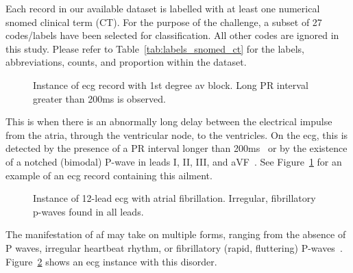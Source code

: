 \documentclass[\main/thesis.tex]{subfiles}
\begin{document}
Each record in our available dataset is labelled with at least one numerical \gls{snomed} clinical term (CT).
For the purpose of the challenge, a subset of 27 codes/labels have been selected for classification.
All other codes are ignored in this study.
Please refer to Table~\ref{tab:labels_snomed_ct} for the labels, abbreviations, counts, and proportion within the dataset.



\begin{description}
    \begin{figure}[H]
        \centering
        \caption{Instance of \gls{ecg} record with 1st degree av block. Long PR interval greater than 200ms is observed.}
        \label{fig:full_IAVB}
    \end{figure}
    \item[\gls{iavb}] This is when there is an abnormally long delay between the electrical impulse from the atria, through the ventricular node, to the ventricles. On the \gls{ecg}, this is detected by the presence of a PR interval longer than 200ms~\cite{carroz_pseudo-pacemaker_2010} or by the existence of a notched (bimodal) P-wave in leads I, II, III, and aVF~\cite{bayes_de_luna_diagnosis_2017}. See Figure~\ref{fig:full_IAVB} for an example of an \gls{ecg} record containing this ailment.
    
    \begin{figure}[H]
        \centering
        \caption{Instance of 12-lead \gls{ecg} with atrial fibrillation. Irregular, fibrillatory p-waves found in all leads.}
        \label{fig:full_AF}
    \end{figure}
    \item[\gls{af}] The manifestation of \gls{af} may take on multiple forms, ranging from the absence of P waves, irregular heartbeat rhythm, or fibrillatory (rapid, fluttering) P-waves~\cite{podrid2001cardiac,afib-ecg}. Figure~\ref{fig:full_AF} shows an \gls{ecg} instance with this disorder.


\end{description}
\end{document}

